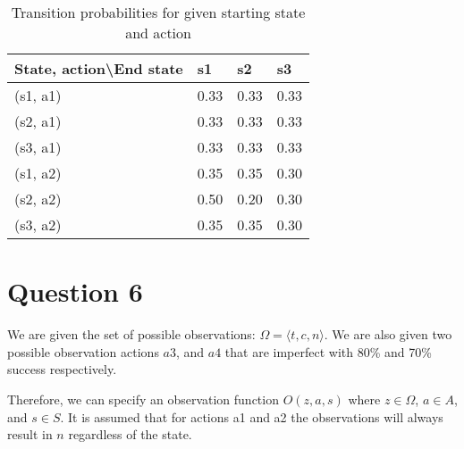 \documentclass[12pt,notitlepage]{article}
\newcommand{\question}{\section*}
\begin{document}
\begin{table}[h]
\centering
\caption{Transition probabilities for given starting state and action}
\label{my-label}
\begin{tabular}{|l|l|l|l|}
\cline{1-4}
    \textbf{State, action\textbackslash End state} & s1   & s2   & s3   \\ \hline
\multicolumn{1}{|l|}{(s1, a1)} & 0.33 & 0.33 & 0.33 \\ \hline
\multicolumn{1}{|l|}{(s2, a1)} & 0.33 & 0.33 & 0.33 \\ \hline
\multicolumn{1}{|l|}{(s3, a1)} & 0.33 & 0.33 & 0.33 \\ \hline
\multicolumn{1}{|l|}{(s1, a2)} & 0.35 & 0.35 & 0.30 \\ \hline
\multicolumn{1}{|l|}{(s2, a2)} & 0.50 & 0.20 & 0.30 \\ \hline
\multicolumn{1}{|l|}{(s3, a2)} & 0.35 & 0.35 & 0.30 \\ \hline
\end{tabular}
\end{table}
\question{Question 6}

We are given the set of possible observations: $\Omega = \langle t,c,n\rangle$.
We are also given two possible observation actions $a3$, and $a4$ that are
imperfect with 80\% and 70\% success respectively.

Therefore, we can specify an observation function $O(z,a,s)$ where $z \in
\Omega$, $a \in A$, and $s \in S$. It is assumed that for actions a1 and a2 the
observations will always result in $n$ regardless of the state.
\end{document}
